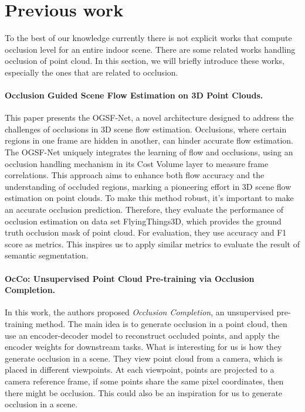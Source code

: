 \documentclass[11pt, a4paper,oneside,chapterprefix=false]{scrbook}
\begin{document}
\section{Previous work}
To the best of our knowledge currently there is not explicit works that compute occlusion level for an entire indoor scene. There are some related works handling occlusion of point cloud. In this section, we will briefly introduce these works, especially the ones that are related to occlusion.  


\paragraph{Occlusion Guided Scene Flow Estimation on 3D Point Clouds.} \label{par:scene flow}

This paper presents the OGSF-Net, a novel architecture designed to address the challenges of occlusions in 3D scene flow estimation. Occlusions, where certain regions in one frame are hidden in another, can hinder accurate flow estimation. The OGSF-Net uniquely integrates the learning of flow and occlusions, using an occlusion handling mechanism in its Cost Volume layer to measure frame correlations. This approach aims to enhance both flow accuracy and the understanding of occluded regions, marking a pioneering effort in 3D scene flow estimation on point clouds. To make this method robust, it's important to make an accurate occlusion prediction. Therefore, they evaluate the performance of occlusion estimation on data set FlyingThings3D, which provides the ground truth occlusion mask of point cloud. For evaluation, they use accuracy and F1 score as metrics. This inspires us to apply similar metrics to evaluate the result of semantic segmentation.

\paragraph{OcCo: Unsupervised Point Cloud Pre-training via Occlusion Completion.} \label{par:OcCo occlusion completion}

In this work, the authors proposed \textit{Occlusion Completion}, an unsupervised pre-training method. The main idea is to generate occlusion in a point cloud, then use an encoder-decoder model to reconstruct occluded points, and apply the encoder weights for downstream tasks. What is interesting for us is how they generate occlusion in a scene. They view point cloud from a camera, which is placed in different viewpoints. At each viewpoint, points are projected to a camera reference frame, if some points share the same pixel coordinates, then there might be occlusion. This could also be an inspiration for us to generate occlusion in a scene.
\end{document}

